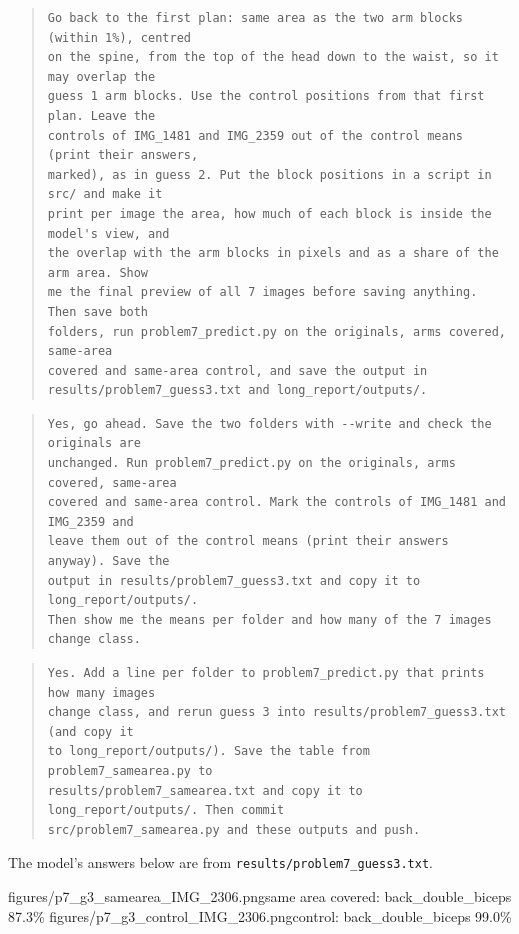 \documentclass[11pt]{article}
\begin{document}
\begin{quote}
\begin{Verbatim}[breaklines, fontsize=\small]
Go back to the first plan: same area as the two arm blocks (within 1%), centred
on the spine, from the top of the head down to the waist, so it may overlap the
guess 1 arm blocks. Use the control positions from that first plan. Leave the
controls of IMG_1481 and IMG_2359 out of the control means (print their answers,
marked), as in guess 2. Put the block positions in a script in src/ and make it
print per image the area, how much of each block is inside the model's view, and
the overlap with the arm blocks in pixels and as a share of the arm area. Show
me the final preview of all 7 images before saving anything. Then save both
folders, run problem7_predict.py on the originals, arms covered, same-area
covered and same-area control, and save the output in
results/problem7_guess3.txt and long_report/outputs/.
\end{Verbatim}
\end{quote}
\begin{quote}
\begin{Verbatim}[breaklines, fontsize=\small]
Yes, go ahead. Save the two folders with --write and check the originals are
unchanged. Run problem7_predict.py on the originals, arms covered, same-area
covered and same-area control. Mark the controls of IMG_1481 and IMG_2359 and
leave them out of the control means (print their answers anyway). Save the
output in results/problem7_guess3.txt and copy it to long_report/outputs/.
Then show me the means per folder and how many of the 7 images change class.
\end{Verbatim}
\end{quote}
\begin{quote}
\begin{Verbatim}[breaklines, fontsize=\small]
Yes. Add a line per folder to problem7_predict.py that prints how many images
change class, and rerun guess 3 into results/problem7_guess3.txt (and copy it
to long_report/outputs/). Save the table from problem7_samearea.py to
results/problem7_samearea.txt and copy it to long_report/outputs/. Then commit
src/problem7_samearea.py and these outputs and push.
\end{Verbatim}
\end{quote}

The model's answers below are from \texttt{results/problem7\_guess3.txt}.

           {figures/p7_g3_samearea_IMG_2306.png}{same area covered: back\_double\_biceps 87.3\%}
           {figures/p7_g3_control_IMG_2306.png}{control: back\_double\_biceps 99.0\%}
\end{document}

